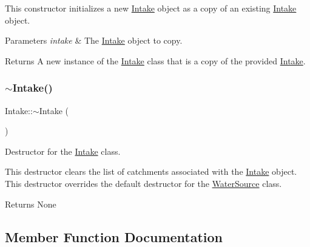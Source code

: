 This constructor initializes a new \mbox{\hyperlink{classIntake}{Intake}} object as a copy of an existing \mbox{\hyperlink{classIntake}{Intake}} object.


\begin{DoxyParams}{Parameters}
{\em intake} & The \mbox{\hyperlink{classIntake}{Intake}} object to copy.\\
\hline
\end{DoxyParams}
\begin{DoxyReturn}{Returns}
A new instance of the \mbox{\hyperlink{classIntake}{Intake}} class that is a copy of the provided \mbox{\hyperlink{classIntake}{Intake}}. 
\end{DoxyReturn}
\mbox{\label{classIntake_abf57ff6edf55f292921fb7838059ad26}} 
\subsubsection{\texorpdfstring{$\sim$\+Intake()}{~Intake()}}
{\footnotesize\ttfamily Intake\+::$\sim$\+Intake (\begin{DoxyParamCaption}{ }\end{DoxyParamCaption})\hspace{0.3cm}{\ttfamily [override]}}



Destructor for the \mbox{\hyperlink{classIntake}{Intake}} class. 

This destructor clears the list of catchments associated with the \mbox{\hyperlink{classIntake}{Intake}} object. This destructor overrides the default destructor for the \mbox{\hyperlink{classWaterSource}{Water\+Source}} class.

\begin{DoxyReturn}{Returns}
None 
\end{DoxyReturn}


\subsection{Member Function Documentation}
\mbox{\label{classIntake_acd5ab74c4091b286e69ecdcc495d83ce}} 
